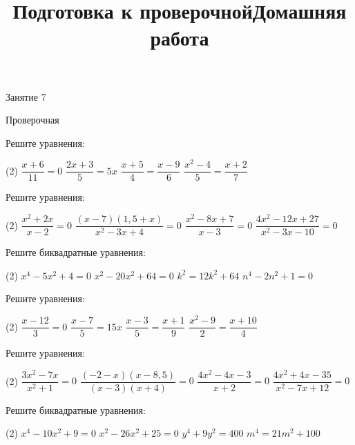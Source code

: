 \begin{class}[number=7]
	\title{Подготовка к проверочной}
	\begin{listofex}
		\item Занятие 7
	\end{listofex}
\end{class}

\begin{exam}
	\begin{listofex}
		\item Проверочная
	\end{listofex}
\end{exam}

\begin{consultation}
	\begin{listofex}
		\item Решите уравнения:
		\begin{tasks}(2)
			\task \( \dfrac{x+6}{11}=0 \)
			\task \( \dfrac{2x+3}{5}=5x \)
			\task \( \dfrac{x+5}{4}=\dfrac{x-9}{6} \)
			\task \( \dfrac{x^2-4}{5}=\dfrac{x+2}{7} \)
		\end{tasks}
		\item Решите уравнения:
			\begin{tasks}(2)
				\task \( \dfrac{x^2+2x}{x-2}=0 \)
				\task \( \dfrac{(x-7)(1,5+x)}{x^2-3x+4}=0 \)
				\task \( \dfrac{x^2-8x+7}{x-3}=0 \)
				\task \( \dfrac{4x^2-12x+27}{x^2-3x-10}=0 \)
			\end{tasks}
		\item Решите биквадратные уравнения:
		\begin{tasks}(2)
			\task \( x^4-5x^2+4=0 \)
			\task \( x^2-20x^2+64=0 \)
			\task \( k^2=12k^2+64 \)
			\task \( n^4-2n^2+1=0 \)
		\end{tasks}
	\end{listofex}
	\newpage
	\title{Домашняя работа}
	\begin{listofex}
		\item Решите уравнения:
		\begin{tasks}(2)
			\task \( \dfrac{x-12}{3}=0 \)
			\task \( \dfrac{x-7}{5}=15x \)
			\task \( \dfrac{x-3}{5}=\dfrac{x+1}{9} \)
			\task \( \dfrac{x^2-9}{2}=\dfrac{x+10}{4} \)
		\end{tasks}
		\item Решите уравнения:
		\begin{tasks}(2)
			\task \( \dfrac{3x^2-7x}{x^2+1}=0 \)
			\task \( \dfrac{(-2-x)(x-8,5)}{(x-3)(x+4)}=0 \)
			\task \( \dfrac{4x^2-4x-3}{x+2}=0 \)
			\task \( \dfrac{4x^2+4x-35}{x^2-7x+12}=0 \)
		\end{tasks}
		\item Решите биквадратные уравнения:
		\begin{tasks}(2)
			\task \( x^4-10x^2+9=0 \)
			\task \( x^2-26x^2+25=0 \)
			\task \( y^4+9y^2=400 \)
			\task \( m^4=21m^2+100 \)
		\end{tasks}
	\end{listofex}
\end{consultation}

